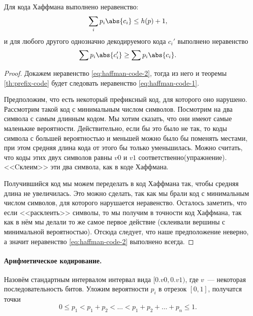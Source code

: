 \begin{theorem}[Хаффман]
    Для кода Хаффмана выполнено неравенство:
    \begin{equation}
        \label{eq:haffman-code-1}
        \sum_i p_i \abs{c_i} \le h(p) + 1,
    \end{equation}
    и для любого другого однозначно декодируемого кода $c_i'$ выполнено неравенство
    \begin{equation}
        \label{eq:haffman-code-2}
        \sum p_i\abs{c_i'} \ge \sum p_i\abs{c_i}.
    \end{equation}
\end{theorem}

\begin{proof}
    Докажем неравенство \eqref{eq:haffman-code-2}, тогда из него и теоремы \ref{th:prefix-code} будет
    следовать неравенство \eqref{eq:haffman-code-1}.

    Предположим, что есть некоторый префиксный код, для которого оно нарушено. Рассмотрим такой код с
    минимальным числом символов. Посмотрим на два символа с самым длинным кодом. Мы хотим сказать, что
    они имеют самые маленькие вероятности. Действительно, если бы это было не так, то коды символа с
    большей вероятностью и меньшей можно было бы поменять местами, при этом средняя длина кода от этого
    бы только уменьшилась. Можно считать, что коды этих двух символов равны $v0$ и $v1$
    соответственно(упражнение). <<Cклеим>> эти два символа, как в коде Хаффмана.

    Получившийся код мы можем переделать в код Хаффмана так, чтобы средняя длина не увеличилась. Это
    можно сделать, так как мы брали код с минимальным числом символов, для которого нарушается
    неравенство. Осталось заметить, что если <<расклеить>> символы, то мы получим в точности 
    код Хаффмана, так как в нём мы делали то же самое первое действие (склеивали вершины с минимальной
    вероятностью). Отсюда следует, что наше предположение неверно, а значит неравенство
    \eqref{eq:haffman-code-2} выполнено всегда.
\end{proof}

\paragraph{Арифметическое кодирование.}
Назовём стандартным интервалом интервал вида $[0.v0, 0.v1)$, где $v$~--- некоторая последовательность
битов. Уложим вероятности $p_i$ в отрезок $[0, 1]$, получатся точки
$$
0 \le p_1 <  p_1 + p_2 < \dots < p_1 + p_2 + \dots + p_n \le 1.
$$ 

